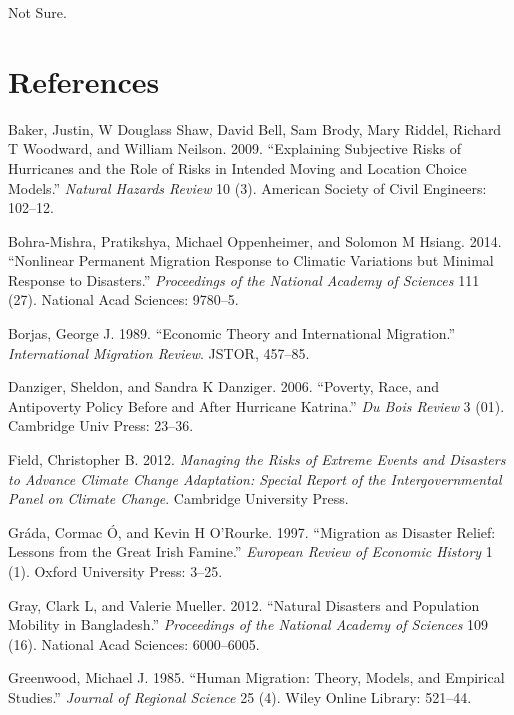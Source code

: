 \documentclass[]{article}
\begin{document}
Not Sure.

\newpage

\section*{References}\label{references}

\hypertarget{refs}{}
\hypertarget{ref-baker2009explaining}{}
Baker, Justin, W Douglass Shaw, David Bell, Sam Brody, Mary Riddel,
Richard T Woodward, and William Neilson. 2009. ``Explaining Subjective
Risks of Hurricanes and the Role of Risks in Intended Moving and
Location Choice Models.'' \emph{Natural Hazards Review} 10 (3). American
Society of Civil Engineers: 102--12.

\hypertarget{ref-bohra2014nonlinear}{}
Bohra-Mishra, Pratikshya, Michael Oppenheimer, and Solomon M Hsiang.
2014. ``Nonlinear Permanent Migration Response to Climatic Variations
but Minimal Response to Disasters.'' \emph{Proceedings of the National
Academy of Sciences} 111 (27). National Acad Sciences: 9780--5.

\hypertarget{ref-borjas1989economic}{}
Borjas, George J. 1989. ``Economic Theory and International Migration.''
\emph{International Migration Review}. JSTOR, 457--85.

\hypertarget{ref-danziger2006poverty}{}
Danziger, Sheldon, and Sandra K Danziger. 2006. ``Poverty, Race, and
Antipoverty Policy Before and After Hurricane Katrina.'' \emph{Du Bois
Review} 3 (01). Cambridge Univ Press: 23--36.

\hypertarget{ref-field2012managing}{}
Field, Christopher B. 2012. \emph{Managing the Risks of Extreme Events
and Disasters to Advance Climate Change Adaptation: Special Report of
the Intergovernmental Panel on Climate Change}. Cambridge University
Press.

\hypertarget{ref-grada1997migration}{}
Gráda, Cormac Ó, and Kevin H O'Rourke. 1997. ``Migration as Disaster
Relief: Lessons from the Great Irish Famine.'' \emph{European Review of
Economic History} 1 (1). Oxford University Press: 3--25.

\hypertarget{ref-gray2012natural}{}
Gray, Clark L, and Valerie Mueller. 2012. ``Natural Disasters and
Population Mobility in Bangladesh.'' \emph{Proceedings of the National
Academy of Sciences} 109 (16). National Acad Sciences: 6000--6005.

\hypertarget{ref-greenwood1985human}{}
Greenwood, Michael J. 1985. ``Human Migration: Theory, Models, and
Empirical Studies.'' \emph{Journal of Regional Science} 25 (4). Wiley
Online Library: 521--44.
\end{document}
